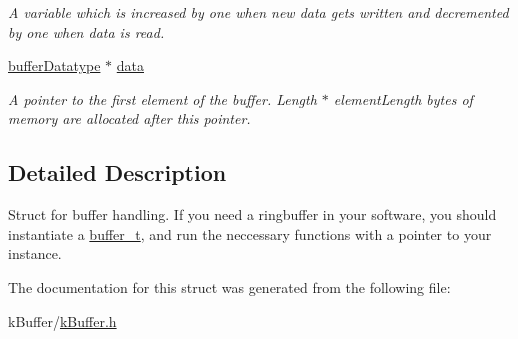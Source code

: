 \begin{DoxyCompactItemize}
\begin{DoxyCompactList}\small\item\em A variable which is increased by one when new data gets written and decremented by one when data is read. \end{DoxyCompactList}\item 
\hyperlink{k_buffer_8h_ae8d6ebfbda34ebc2e00138c04b46e9b1}{buffer\+Datatype} $\ast$ \hyperlink{structbuffer__t_a974e9a505549d9f8ad9e45cb1b562413}{data}\hypertarget{structbuffer__t_a974e9a505549d9f8ad9e45cb1b562413}{}\label{structbuffer__t_a974e9a505549d9f8ad9e45cb1b562413}

\begin{DoxyCompactList}\small\item\em A pointer to the first element of the buffer. Length $\ast$ element\+Length bytes of memory are allocated after this pointer. \end{DoxyCompactList}\end{DoxyCompactItemize}


\subsection{Detailed Description}
Struct for buffer handling. If you need a ringbuffer in your software, you should instantiate a \hyperlink{structbuffer__t}{buffer\+\_\+t}, and run the neccessary functions with a pointer to your instance. 

The documentation for this struct was generated from the following file\+:\begin{DoxyCompactItemize}
\item 
k\+Buffer/\hyperlink{k_buffer_8h}{k\+Buffer.\+h}\end{DoxyCompactItemize}

